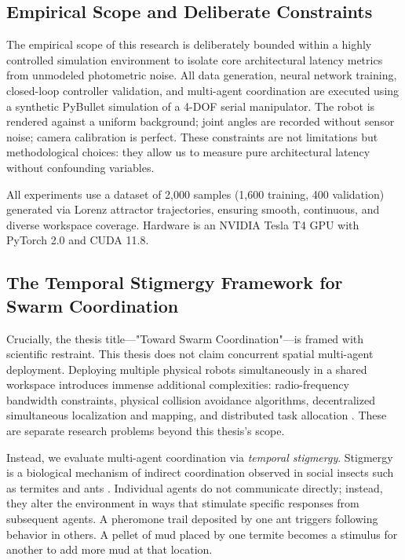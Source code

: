 \documentclass[12pt,a4paper,oneside]{report}
\begin{document}
\subsection{Empirical Scope and Deliberate Constraints}
\label{subsec:empirical_scope}

The empirical scope of this research is deliberately bounded within a highly controlled simulation environment to isolate core architectural latency metrics from unmodeled photometric noise. All data generation, neural network training, closed-loop controller validation, and multi-agent coordination are executed using a synthetic PyBullet simulation of a 4-DOF serial manipulator. The robot is rendered against a uniform background; joint angles are recorded without sensor noise; camera calibration is perfect. These constraints are not limitations but methodological choices: they allow us to measure pure architectural latency without confounding variables.

All experiments use a dataset of 2,000 samples (1,600 training, 400 validation) generated via Lorenz attractor trajectories, ensuring smooth, continuous, and diverse workspace coverage. Hardware is an NVIDIA Tesla T4 GPU with PyTorch 2.0 and CUDA 11.8.

\subsection{The Temporal Stigmergy Framework for Swarm Coordination}
\label{subsec:temporal_stigmergy_framework}

Crucially, the thesis title—"Toward Swarm Coordination"—is framed with scientific restraint. This thesis does not claim concurrent spatial multi-agent deployment. Deploying multiple physical robots simultaneously in a shared workspace introduces immense additional complexities: radio-frequency bandwidth constraints, physical collision avoidance algorithms, decentralized simultaneous localization and mapping, and distributed task allocation \cite{matsuki2024gaussian, keetha2024splattam}. These are separate research problems beyond this thesis's scope.

Instead, we evaluate multi-agent coordination via \textit{temporal stigmergy}. Stigmergy is a biological mechanism of indirect coordination observed in social insects such as termites and ants \cite{bongard2006resilient}. Individual agents do not communicate directly; instead, they alter the environment in ways that stimulate specific responses from subsequent agents. A pheromone trail deposited by one ant triggers following behavior in others. A pellet of mud placed by one termite becomes a stimulus for another to add more mud at that location.
\end{document}
